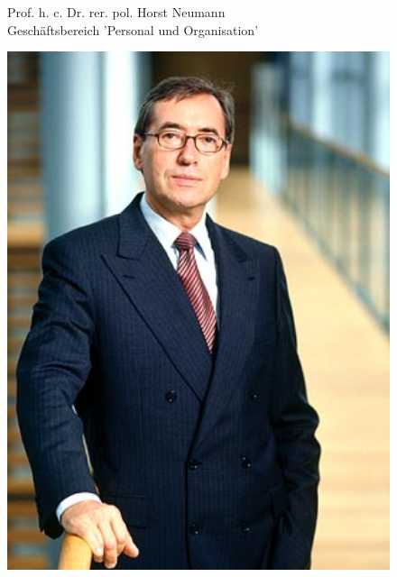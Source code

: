 \documentclass[12pt]{article}
\begin{document}
\begin{figure}[here!]
	\centering
	\begin{minipage}[h]{0.65\textwidth}
		Prof. h. c. Dr. rer. pol. Horst Neumann\\
		Geschäftsbereich 'Personal und Organisation'
	\end{minipage}
	\begin{minipage}[h]{0.10\textwidth}
		\hspace{1cm} 
	\end{minipage}
	\begin{minipage}[h]{0.20\textwidth}
		\centering
		\includegraphics[width=1.0\textwidth]{images/HorstNeumann.jpg}
		\label{fig:vorstandvw5}
	\end{minipage}
\end{figure}
\end{document}
